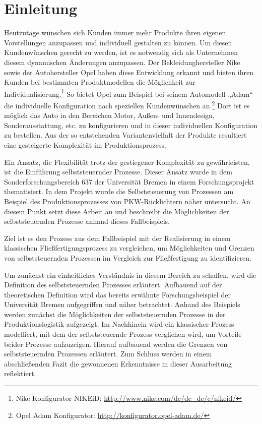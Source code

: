 \section{Einleitung}
\label{sec:Einleitung}
Heutzutage wünschen sich Kunden immer mehr Produkte ihren eigenen Vorstellungen
anzupassen und individuell gestalten zu können. Um diesen Kundenwünschen gerecht
zu werden, ist es notwendig sich als Unternehmen diesem dynamischen Änderungen
anzupassen.  Der Bekleidunghersteller Nike sowie der Autohersteller Opel haben
diese Entwicklung erkannt und bieten ihren Kunden bei bestimmten Produktmodellen
die Möglichkeit zur Individualisierung.\footnote{Nike Konfigurator NIKEiD:
\url{http://www.nike.com/de/de_de/c/nikeid/}} So bietet Opel zum Beispiel bei
seinem Automodell „Adam“ die individuelle Konfiguration nach speziellen
Kundenwünschen an.\footnote{Opel Adam Konfigurator:
\url{http://konfigurator.opel-adam.de/}} Dort ist es möglich das Auto in den
Bereichen Motor, Außen- und Innendesign, Sonderausstattung, etc. zu
konfigurieren und in dieser individuellen Konfiguration zu bestellen. Aus der
so entstehenden Variantenvielfalt der Produkte resultiert eine gesteigerte
Komplexität im Produktionsprozess.

Ein Ansatz, die Flexibilität trotz der gestiegener Komplexität zu gewährleisten,
ist die Einführung selbststeuernder Prozesse. Dieser Ansatz wurde in dem
Sonderforschungsbereich 637 der Universität Bremen in einem Forschungsprojekt
thematisiert. In dem Projekt wurde die Selbststeuerung von Prozessen am Beispiel
des Produktionsprozesses von PKW-Rücklichtern näher untersucht. An diesem Punkt
setzt diese Arbeit an und beschreibt die Möglichkeiten der selbststeuernden
Prozesse anhand dieses Fallbeispiels.

Ziel ist es den Prozess aus dem Fallbeispiel mit der Realisierung in einem
klassischen Fließfertigungsprozess zu vergleichen, um Möglichkeiten und Grenzen
von selbststeuernden Prozessen im Vergleich zur Fließfertigung zu
identifizieren.

Um zunächst ein einheitliches Verständnis in diesem Bereich zu schaffen, wird
die Definition des selbststeuernden Prozesses erläutert. Aufbauend auf der
theoretischen Definition wird das bereits erwähnte Forschungsbeispiel der
Universität Bremen aufgegriffen und näher betrachtet. Anhand des Beispiels
werden zunächst die Möglichkeiten der selbststeuernden Prozesse in der
Produktionslogistik aufgezeigt. Im Nachhinein wird ein klassischer Prozess
modelliert, mit dem der selbststeuernde Prozess verglichen wird, um Vorteile
beider Prozesse aufzuzeigen. Hierauf aufbauend werden die Grenzen von
selbststeuernden Prozessen erläutert. Zum Schluss werden in einem abschließenden
Fazit die gewonnenen Erkenntnisse in dieser Ausarbeitung reflektiert.

\clearpage
